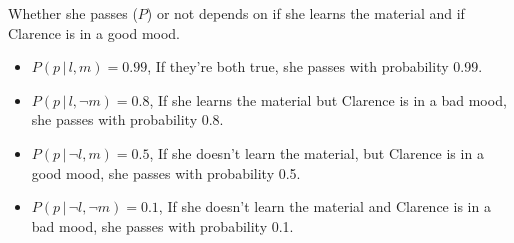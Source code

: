 \documentclass[fleqn]{hw7}
\begin{document}
Whether she passes ($P$) or not depends on if she learns the material and if Clarence is in a good mood.
\begin{itemize}
	\item $ P(p\,|\,l,m) = 0.99 $, If they're both true, she passes with probability 0.99.
	\item $ P(p\,|\,l,\neg m) = 0.8 $, If she learns the material but Clarence is in a bad mood, she passes with probability 0.8.
	\item $ P(p\,|\,\neg l,m) = 0.5 $, If she doesn't learn the material, but Clarence is in a good mood, she passes with probability 0.5.
	\item $ P(p\,|\,\neg l,\neg m) = 0.1 $, If she doesn't learn the material and Clarence is in a bad mood, she passes with probability 0.1.
\end{itemize}
  
\end{document}
